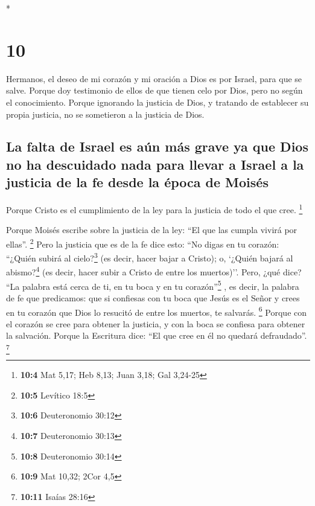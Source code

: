 \begin{paracol}{2}
\begin{otherlanguage}{english}
\end{otherlanguage}

\switchcolumn[0]*

\hypertarget{section-18}{%
\section{10}\label{section-18}}

 Hermanos, el deseo de mi corazón y mi oración a Dios es
por Israel, para que se salve.  Porque doy testimonio de
ellos de que tienen celo por Dios, pero no según el conocimiento.
 Porque ignorando la justicia de Dios, y tratando de
establecer su propia justicia, no se sometieron a la justicia de Dios.

\hypertarget{la-falta-de-israel-es-auxfan-muxe1s-grave-ya-que-dios-no-ha-descuidado-nada-para-llevar-a-israel-a-la-justicia-de-la-fe-desde-la-uxe9poca-de-moisuxe9s}{%
\subsection{La falta de Israel es aún más grave ya que Dios no ha
descuidado nada para llevar a Israel a la justicia de la fe desde la
época de
Moisés}\label{la-falta-de-israel-es-auxfan-muxe1s-grave-ya-que-dios-no-ha-descuidado-nada-para-llevar-a-israel-a-la-justicia-de-la-fe-desde-la-uxe9poca-de-moisuxe9s}}

 Porque Cristo es el cumplimiento de la ley para la
justicia de todo el que cree. \footnote{\textbf{10:4} Mat 5,17; Heb
  8,13; Juan 3,18; Gal 3,24-25}

 Porque Moisés escribe sobre la justicia de la ley: ``El
que las cumpla vivirá por ellas''. \footnote{\textbf{10:5} Levítico 18:5}
 Pero la justicia que es de la fe dice esto: ``No digas en
tu corazón: ``¿Quién subirá al cielo?\footnote{\textbf{10:6}
  Deuteronomio 30:12} (es decir, hacer bajar a Cristo); 
o, `¿Quién bajará al abismo?\footnote{\textbf{10:7} Deuteronomio 30:13}
(es decir, hacer subir a Cristo de entre los muertos)''. 
Pero, ¿qué dice? ``La palabra está cerca de ti, en tu boca y en tu
corazón''\footnote{\textbf{10:8} Deuteronomio 30:14} , es decir, la
palabra de fe que predicamos:  que si confiesas con tu
boca que Jesús es el Señor y crees en tu corazón que Dios lo resucitó de
entre los muertos, te salvarás. \footnote{\textbf{10:9} Mat 10,32; 2Cor
  4,5}  Porque con el corazón se cree para obtener la
justicia, y con la boca se confiesa para obtener la salvación.
 Porque la Escritura dice: ``El que cree en él no quedará
defraudado''. \footnote{\textbf{10:11} Isaías 28:16}


\end{paracol}
